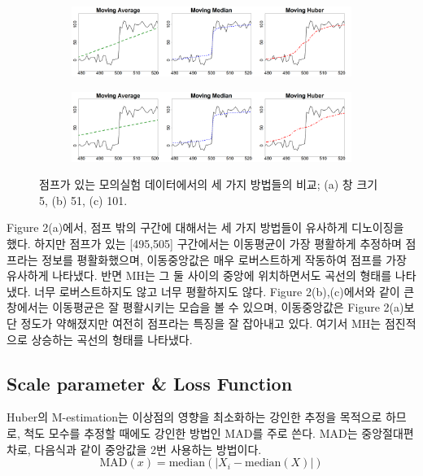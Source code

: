 \documentclass[letterpaper,12pt]{article}
\begin{document}
{\begin{figure}[H]
     \vspace{1em}
    
    \begin{subfigure}[b]{\linewidth}
        \centering
        \includegraphics[width=\linewidth]{figures/3comparison51.png}
        \caption{}
    \end{subfigure}
       
    \vspace{1em}
    
    \begin{subfigure}[b]{\linewidth}
        \centering
        \includegraphics[width=\linewidth]{figures/3comparison101.png}
        \caption{}
    \end{subfigure}
    
    \caption{점프가 있는 모의실험 데이터에서의 세 가지 방법들의 비교; (a) 창 크기 5, (b) 51, (c) 101.}
    \label{fig:comparison}
\end{figure}
Figure 2(a)에서, 점프 밖의 구간에 대해서는 세 가지 방법들이 유사하게 디노이징을 했다. 하지만 점프가 있는 [495,505] 구간에서는 이동평균이 가장 평활하게 추정하며 점프라는 정보를 평활화했으며, 이동중앙값은 매우 로버스트하게 작동하여 점프를 가장 유사하게 나타냈다. 반면 MH는 그 둘 사이의 중앙에 위치하면서도 곡선의 형태를 나타냈다. 너무 로버스트하지도 않고 너무 평활하지도 않다.
Figure 2(b),(c)에서와 같이 큰 창에서는 이동평균은 잘 평활시키는 모습을 볼 수 있으며, 이동중앙값은 Figure 2(a)보단 정도가 약해졌지만 여전히 점프라는 특징을 잘 잡아내고 있다. 여기서 MH는 점진적으로 상승하는 곡선의 형태를 나타냈다.







\subsection{Scale parameter \& Loss Function}\label{sec:setup}
Huber의 M-estimation는 이상점의 영향을 최소화하는 강인한 추정을 목적으로 하므로, 척도 모수를 추정할 때에도 강인한 방법인 MAD를 주로 쓴다.
MAD는 중앙절대편차로, 다음식과 같이 중앙값을 2번 사용하는 방법이다.
\[
\mbox{MAD}(x)= \mbox{median}(|X_i-\mbox{median}(X)|)
\]


}
\end{document}
